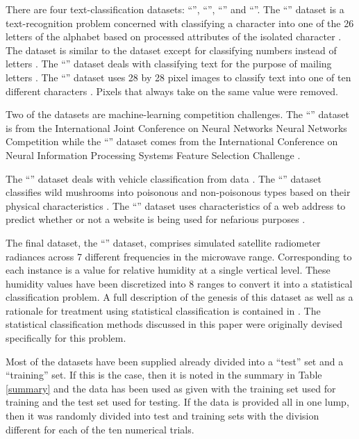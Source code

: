 There are four text-classification datasets: ``'', ``'',
``'' and ``''.
The ``'' dataset is a text-recognition problem concerned with classifying
a character into one of the 26 letters of the alphabet based on processed
attributes of the isolated character \citep{Frey_Slate1991}.
The  dataset is similar to the  dataset except for
classifying numbers instead of letters \citep{Alimoglu1996}.
The ``'' dataset deals with classifying text for the purpose of mailing
letters \citep{Hull1994}.
The ``'' dataset uses 28 by 28 pixel images to classify text into one
of ten different characters \citep{LeCun_etal1998}. 
Pixels that always take on the same value were removed.

Two of the datasets are machine-learning competition challenges.
The ``'' dataset is from the International Joint Conference on Neural
Networks Neural Networks Competition\citep{Feldkamp_Puskorius1998} while the ``'' dataset comes 
from the International Conference on Neural Information Processing Systems
Feature Selection Challenge \citep{Guyon_etal2004}.

The ``'' dataset deals with vehicle classification from  data
\citep{Duarte_Hu2004}.
The ``'' dataset classifies wild mushrooms
into poisonous and non-poisonous types based on their physical characteristics \citep{Iba_etal1988}.
The ``'' dataset uses characteristics of a web address to predict whether
or not a website is being used for nefarious purposes \citep{Mohommad_etal2014}.

The final dataset, the ``'' dataset, 
comprises simulated satellite radiometer radiances across 7 different frequencies in the microwave range.
Corresponding to each instance is a value for relative humidity at a single
vertical level.
These humidity values have been discretized into 8 ranges to convert it into a statistical classification problem.
A full description of the genesis of this dataset as well as a rationale for
treatment using statistical classification is contained in \citet{Mills2009}.
The statistical classification methods discussed in this paper were originally
devised specifically for this problem.

Most of the datasets have been supplied already divided into a ``test'' set and a ``training'' set.
If this is the case, then it is noted in the summary in Table \ref{summary}
and the data has been used as given with the training set used for training
and the test set used for testing.
If the data is provided all in one lump, then it was randomly divided into 
test and training sets with the division different for each of the ten numerical trials.

